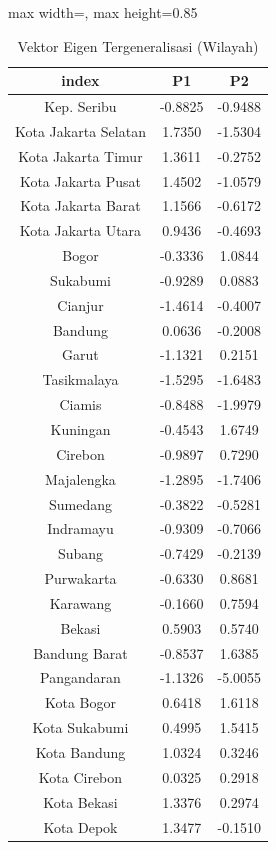 \begin{table}[H]
\centering
\caption{Vektor Eigen Tergeneralisasi (Wilayah)} \label{tab:appv_w}
\begin{adjustbox}{max width=\textwidth, max height=0.85\textheight}
\begin{tabular}{|c|c|c|}
\hline
\textbf{index} & \textbf{P1} & \textbf{P2} \\
\hline
Kep. Seribu & -0.8825 & -0.9488 \\
Kota Jakarta Selatan & 1.7350 & -1.5304 \\
Kota Jakarta Timur & 1.3611 & -0.2752 \\
Kota Jakarta Pusat & 1.4502 & -1.0579 \\
Kota Jakarta Barat & 1.1566 & -0.6172 \\
Kota Jakarta Utara & 0.9436 & -0.4693 \\
Bogor & -0.3336 & 1.0844 \\
Sukabumi & -0.9289 & 0.0883 \\
Cianjur & -1.4614 & -0.4007 \\
Bandung & 0.0636 & -0.2008 \\
Garut & -1.1321 & 0.2151 \\
Tasikmalaya & -1.5295 & -1.6483 \\
Ciamis & -0.8488 & -1.9979 \\
Kuningan & -0.4543 & 1.6749 \\
Cirebon & -0.9897 & 0.7290 \\
Majalengka & -1.2895 & -1.7406 \\
Sumedang & -0.3822 & -0.5281 \\
Indramayu & -0.9309 & -0.7066 \\
Subang & -0.7429 & -0.2139 \\
Purwakarta & -0.6330 & 0.8681 \\
Karawang & -0.1660 & 0.7594 \\
Bekasi & 0.5903 & 0.5740 \\
Bandung Barat & -0.8537 & 1.6385 \\
Pangandaran & -1.1326 & -5.0055 \\
Kota Bogor & 0.6418 & 1.6118 \\
Kota Sukabumi & 0.4995 & 1.5415 \\
Kota Bandung & 1.0324 & 0.3246 \\
Kota Cirebon & 0.0325 & 0.2918 \\
Kota Bekasi & 1.3376 & 0.2974 \\
Kota Depok & 1.3477 & -0.1510 \\

\end{tabular}
\end{adjustbox}
\end{table}
